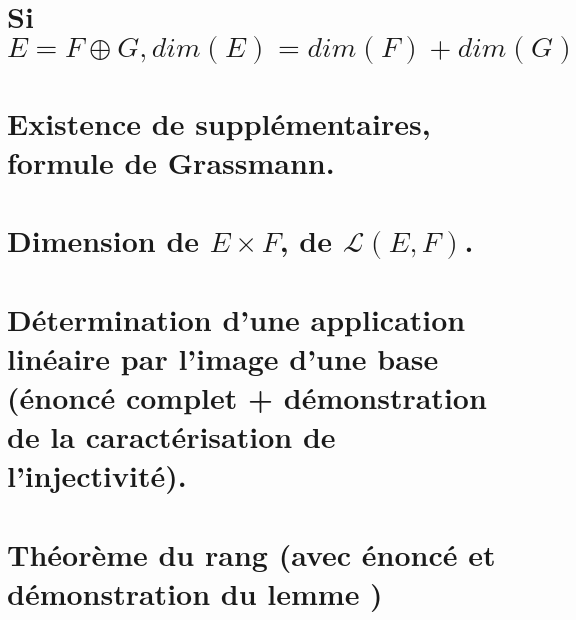 \documentclass{article}
\begin{document}
\section{Si $E= F \oplus G, dim(E)=dim(F)+dim(G)$}
\section{Existence de supplémentaires, formule de Grassmann.}
\section{Dimension de $E \times F$, de $\mathcal L(E,F)$.}
\section{Détermination d'une application linéaire par l'image d'une base (énoncé complet + démonstration de la caractérisation de l'injectivité).}
\section{Théorème du rang (avec énoncé et démonstration du lemme )}
\end{document}
